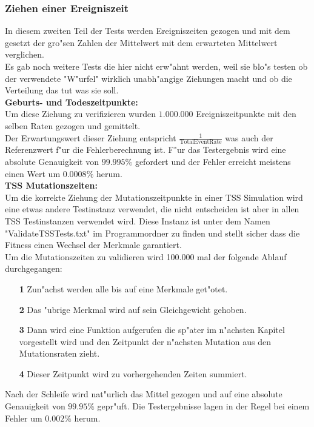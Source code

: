 \documentclass[11pt, a4paper, german]{article}
\theoremstyle{plain}
\begin{document}
	\subsubsection{Ziehen einer Ereigniszeit}
	In diesem zweiten Teil der Tests werden Ereigniszeiten gezogen und mit dem gesetzt der gro"sen Zahlen der Mittelwert mit dem erwarteten Mittelwert verglichen.\\
	Es gab noch weitere Tests die hier nicht erw"ahnt werden, weil sie blo"s testen ob der verwendete "{}W"urfel"{} wirklich unabh"angige Ziehungen macht und ob die Verteilung das tut was sie soll.\\
	
	\textbf{Geburts- und Todeszeitpunkte:}\\
	Um diese Ziehung zu verifizieren wurden $ 1.000.000 $ Ereigniszeitpunkte mit den selben Raten gezogen und gemittelt.\\
	Der Erwartungswert dieser Ziehung entspricht $ \frac{1}{\text{TotalEventRate}} $ was auch der Referenzwert f"ur die Fehlerberechnung ist. F"ur das Testergebnis wird eine absolute Genauigkeit von $ 99.995 \% $ gefordert und der Fehler erreicht meistens einen Wert um $ 0.0008\% $ herum.\\
	
	\textbf{TSS Mutationszeiten:}\\
	Um die korrekte Ziehung der Mutationszeitpunkte in einer TSS Simulation wird eine etwas andere Testinstanz verwendet, die nicht entscheiden ist aber in allen TSS Testinstanzen verwendet wird. Diese Instanz ist unter dem Namen "{}ValidateTSSTests.txt"{} im Programmordner zu finden und stellt sicher dass die Fitness einen Wechsel der Merkmale garantiert.\\
	Um die Mutationszeiten zu validieren wird 100.000 mal der folgende Ablauf durchgegangen:
	\begin{itemize}
		\item[\textbf{1}] Zun"achst werden alle bis auf eine Merkmale get"otet.
		\item[\textbf{2}] Das "ubrige Merkmal wird auf sein Gleichgewicht gehoben.
		\item[\textbf{3}] Dann wird eine Funktion aufgerufen die sp"ater im n"achsten Kapitel vorgestellt wird und den Zeitpunkt der n"achsten Mutation aus den Mutationsraten zieht.
		\item[\textbf{4}] Dieser Zeitpunkt wird zu vorhergehenden Zeiten summiert.
	\end{itemize}
	Nach der Schleife wird nat"urlich das Mittel gezogen und auf eine absolute Genauigkeit von $ 99.95\% $ gepr"uft. Die Testergebnisse lagen in der Regel bei einem Fehler um $ 0.002\% $ herum.\\
	
\end{document}
